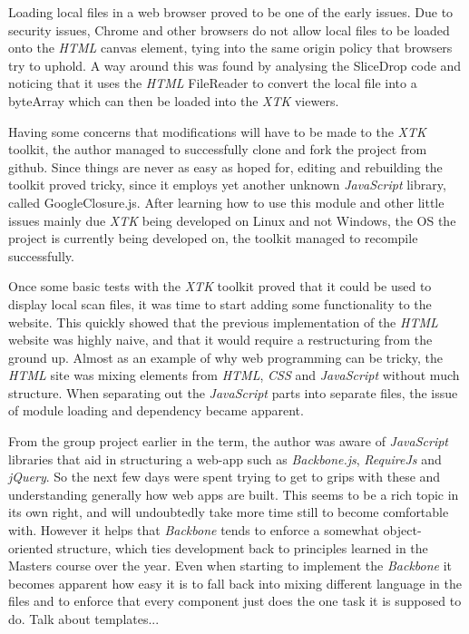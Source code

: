 \documentclass[a4paper,11pt,titlepage]{article}
\begin{document}
Loading local files in a web browser proved to be one of the early issues. Due to security issues, Chrome and other browsers do not allow local files to be loaded onto the \textit{HTML} canvas element, tying into the same origin policy that browsers try to uphold. A way around this was found by analysing the SliceDrop code and noticing that it uses the \textit{HTML} FileReader to convert the local file into a byteArray which can then be loaded into the \textit{XTK} viewers.

Having some concerns that modifications will have to be made to the \textit{XTK} toolkit, the author managed to successfully clone and fork the project from github. Since things are never as easy as hoped for, editing and rebuilding the toolkit proved tricky, since it employs yet another unknown \textit{JavaScript} library, called GoogleClosure.js. After learning how to use this module and other little issues mainly due \textit{XTK} being developed on Linux and not Windows, the OS the project is currently being developed on, the toolkit managed to recompile successfully.

Once some basic tests with the \textit{XTK} toolkit proved that it could be used to display local scan files, it was time to start adding some functionality to the website. This quickly showed that the previous implementation of the \textit{HTML} website was highly naive, and that it would require a restructuring from the ground up. Almost as an example of why web programming can be tricky, the \textit{HTML} site was mixing elements from \textit{HTML}, \textit{CSS} and \textit{JavaScript} without much structure. When separating out the \textit{JavaScript} parts into separate files, the issue of module loading and dependency became apparent.

From the group project earlier in the term, the author was aware of \textit{JavaScript} libraries that aid in structuring a web-app such as \textit{Backbone.js}, \textit{RequireJs} and \textit{jQuery}. So the next few days were spent trying to get to grips with these and understanding generally how web apps are built. This seems to be a rich topic in its own right, and will undoubtedly take more time still to become comfortable with. However it helps that \textit{Backbone} tends to enforce a somewhat object-oriented structure, which ties development back to principles learned in the Masters course over the year. Even when starting to implement the \textit{Backbone} it becomes apparent how easy it is to fall back into mixing different language in the files and to enforce that every component just does the one task it is supposed to do. Talk about templates...
\end{document}
